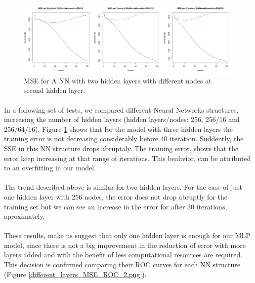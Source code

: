 \documentclass[11.5pt]{article}
\newcounter{Figure}
\newcounter{graphics}
\begin{document}
\begin{figure}[h!]
\includegraphics[width=1\textwidth]{report_mlp/256-16_128_256.png}
  \caption{\small MSE for A NN with two hidden layers with different nodes at second hidden layer.}
\label{256-16_128_256.png}
\end{figure}

\paragraph{} In  a following set of tests, we compared different Neural Networks structures, increasing the number of hidden layers (hidden layers/nodes: 256, 256/16 and 256/64/16).  Figure \ref{256-16_128_256.png} shows that for the model with three hidden layers the training error is not decreasing considerably before 40 iteration. Suddently, the SSE in this NN structure drops abruptaly. The training error, shows that the error keep increasing at that range of iterations. This beahvior, can be attributed to an overfitting in our model. 

\paragraph{} Ths trend described above is similar for two hidden layers. For the case of just one hidden layer with 256 nodes, the error does not drop abruptly for the training set but we can see an increase in the error for after 30 iterations, aproximately.

\paragraph{} These results, make us suggest that only one hidden layer is enough for our MLP model, since there is not a big improvement in the reduction of error with more layers added and with the benefit of less computational resources are required.
This decision is confirmed comparing their ROC curves for each NN structure  (Figure \ref{different_layers_MSE_ROC_2.png}).
 
\end{document}

